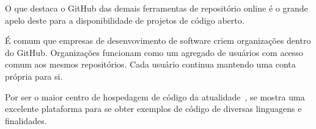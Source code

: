 O que destaca o GitHub das demais ferramentas de repositório online é o grande apelo deste para a disponibilidade de projetos de código aberto.

É comum que empresas de desenvovimento de software criem organizações dentro do GitHub. Organizações funcionam como um agregado de usuários com acesso comum aos mesmos repositórios. Cada usuário continua mantendo uma conta própria para si.

Por ser o maior centro de hospedagem de código da atualidade~\cite{Gousios2012}, se mostra uma excelente plataforma para se obter exemplos de código de diversas linguagens e finalidades.
